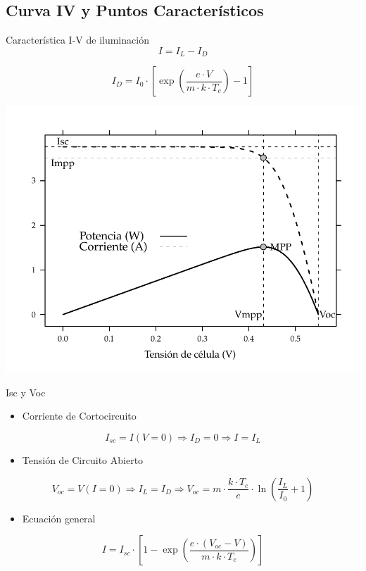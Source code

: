 \documentclass[xcolor={usenames,svgnames,dvipsnames}]{beamer}
\begin{document}
\subsection{Curva IV y Puntos Característicos}
\label{sec:orgad81a9a}
\begin{frame}[label={sec:org10310e3}]{Característica I-V de iluminación}
$$I=I_{L}-I_{D}$$

$$I_{D}=I_{0}\cdot\left[\exp\left(\frac{e\cdot V}{m\cdot k\cdot
      T_{c}}\right)-1\right]$$

\begin{center}
\includegraphics[width=.9\linewidth]{../figs/CurvaIV_Ta20_G800.pdf}
\end{center}
\end{frame}

\begin{frame}[label={sec:orgab0e409}]{Isc y Voc}
\begin{itemize}
\item Corriente de Cortocircuito
\end{itemize}

$$I_{sc}=I(V=0)\Rightarrow I_{D}=0\Rightarrow I=I_{L}$$

\begin{itemize}
\item Tensión de Circuito Abierto
\end{itemize}

$$V_{oc}=V(I=0)\Rightarrow I_{L}=I_{D}\Rightarrow
V_{oc}=m\cdot\frac{k\cdot
  T_{c}}{e}\cdot\ln\left(\frac{I_{L}}{I_{0}}+1\right)$$

\begin{itemize}
\item Ecuación general
\end{itemize}

$$I=I_{sc}\cdot\left[1-\exp\left(\frac{e\cdot(V_{oc}-V)}{m\cdot k\cdot
      T_{c}}\right)\right]$$
\end{frame}
\end{document}
